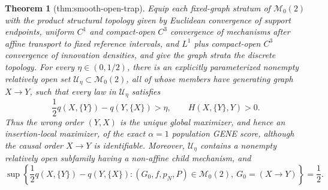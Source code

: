 \documentclass{article}
\newtheorem{theorem}{Theorem}
\begin{document}
\begin{theorem}[thm:smooth-open-trap]\label{thm:smooth-open-trap}
Equip each fixed-graph stratum of \(\mathcal M_0(2)\) with the product structural topology given by Euclidean convergence of support endpoints, uniform \(C^1\) and compact-open \(C^3\) convergence of mechanisms after affine transport to fixed reference intervals, and \(L^1\) plus compact-open \(C^3\) convergence of innovation densities, and give the graph strata the discrete topology. For every \(\eta\in(0,1/2)\), there is an explicitly parameterized nonempty relatively open set \(\mathcal U_\eta\subset\mathcal M_0(2)\), all of whose members have generating graph \(X\to Y\), such that every law in \(\mathcal U_\eta\) satisfies
\[
 \frac12q(X,\{Y\})-q(Y,\{X\})>\eta,
 \qquad H(X,\{Y\},Y)>0.
\]
Thus the wrong order \((Y,X)\) is the unique global maximizer, and hence an insertion-local maximizer, of the exact \(\alpha=1\) population GENE score, although the causal order \(X\to Y\) is identifiable. Moreover, \(\mathcal U_\eta\) contains a nonempty relatively open subfamily having a non-affine child mechanism, and
\[
 \sup\left\{\frac12q(X,\{Y\})-q(Y,\{X\}):(G_0,f,p_N,P)\in\mathcal M_0(2),\ G_0=(X\to Y)\right\}=\frac12.
\]
\end{theorem}
\end{document}
